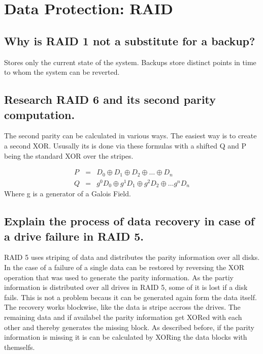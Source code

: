 \section{Data Protection: RAID}

\subsection*{Why is RAID 1 not a substitute for a backup?} %
\label{sub:why_is_raid_1_not_a_substitute_for_a_backup_}
	Stores only the current state of the system.
	Backups store distinct points in time to whom the system can be reverted.

\subsection{Research RAID 6 and its second parity computation.} %
\label{sub:research_raid_6_and_its_second_parity_computation_}
	The second parity can be calculated in various ways.
	The easiest way is to create a second XOR.
	Ususally its is done via these formulas with a shifted Q
	and P being the standard XOR over the stripes.

	\begin{eqnarray}
		P &=& D_0 \oplus D_1 \oplus D_2 \oplus \dotsc \oplus D_n \\
		Q &=& g^0D_0 \oplus g^1D_1 \oplus g^2D_2 \oplus \dotsc g^nD_n 
	\end{eqnarray}
	Where g is a generator of a Galois Field. 

\subsection{Explain the process of data recovery in case of a drive failure in RAID 5.} %
\label{sub:explain_the_process_of_data_recovery_in_case_of_a_drive_failure_in_raid_5_}
	RAID 5 uses striping of data and distributes the parity information over all disks.
	In the case of a failure of a single  data can be restored by reversing the XOR operation
	that was used to generate the parity information.
	As the partiy information is distributed over all drives in RAID 5,
	some of it is lost if a disk fails.
	This is not a problem becaus it can be generated again form the data itself.
	The recovery works blockwise,
	like the data is stripe accross the drives.
	The remaining data and if availabel the parity information get XORed with each other
	and thereby generates the missing block.
	As described before,
	if the parity information is missing it is can be calculated by XORing the data blocks 
	with themselfs.

